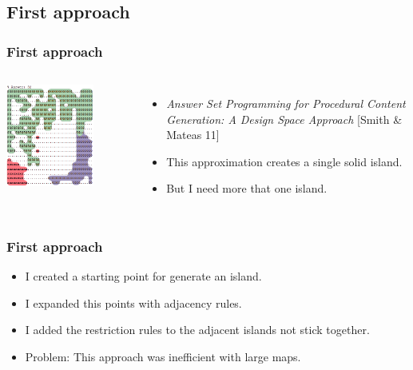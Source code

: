 \subsection{First approach}
\begin{frame}
\frametitle{First approach}

\begin{columns}
	\centering \includegraphics[width=0.7\textwidth]{images/adam.png}
	
	\begin{itemize}
		\item<1-> \textit{Answer Set Programming for Procedural Content Generation: A Design Space Approach} \textcolor{UDCpink}{[Smith \& Mateas 11]}
		\item<2-> This approximation creates a single solid island.
		\item<3-> But I need more that one island.
	\end{itemize} 
\end{columns}
	
\end{frame}

\begin{frame}
\frametitle{First approach}

\begin{itemize}
	\item<1-> I created a starting point for generate an island.
	\item<2-> I expanded this points with adjacency rules.
	\item<3-> I added the restriction rules to the adjacent islands not stick together.
	\item<4-> \textcolor{UDCpink}{Problem:} This approach was inefficient with large maps.
\end{itemize}

\end{frame}

